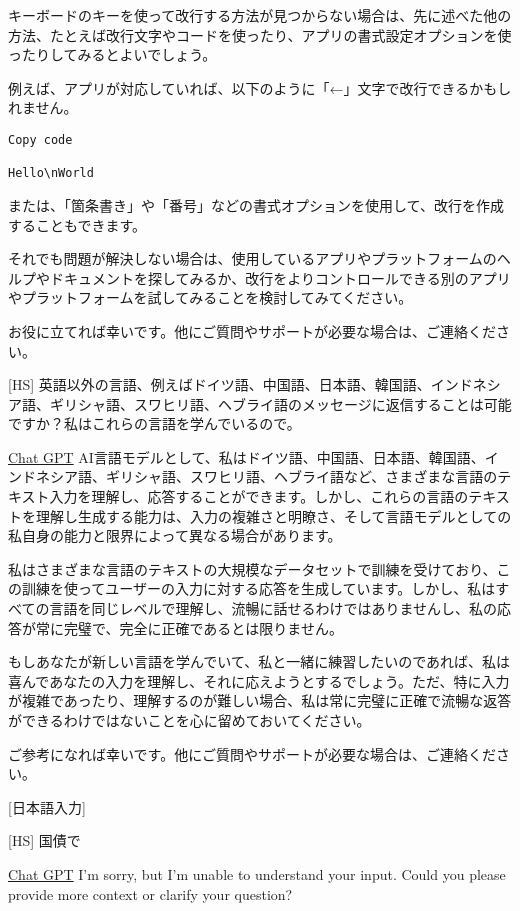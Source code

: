 \documentclass[
]{book}
\theoremstyle{definition}
\theoremstyle{definition}
\theoremstyle{definition}
\theoremstyle{definition}
\theoremstyle{remark}
\begin{document}
キーボードのキーを使って改行する方法が見つからない場合は、先に述べた他の方法、たとえば改行文字やコードを使ったり、アプリの書式設定オプションを使ったりしてみるとよいでしょう。

例えば、アプリが対応していれば、以下のように「←」文字で改行できるかもしれません。

\begin{verbatim}
Copy code

Hello\nWorld
\end{verbatim}

または、「箇条書き」や「番号」などの書式オプションを使用して、改行を作成することもできます。

それでも問題が解決しない場合は、使用しているアプリやプラットフォームのヘルプやドキュメントを探してみるか、改行をよりコントロールできる別のアプリやプラットフォームを試してみることを検討してみてください。

お役に立てれば幸いです。他にご質問やサポートが必要な場合は、ご連絡ください。

{[}HS{]} 英語以外の言語、例えばドイツ語、中国語、日本語、韓国語、インドネシア語、ギリシャ語、スワヒリ語、ヘブライ語のメッセージに返信することは可能ですか？私はこれらの言語を学んでいるので。

\protect\hyperlink{chatgpt}{Chat GPT} AI言語モデルとして、私はドイツ語、中国語、日本語、韓国語、インドネシア語、ギリシャ語、スワヒリ語、ヘブライ語など、さまざまな言語のテキスト入力を理解し、応答することができます。しかし、これらの言語のテキストを理解し生成する能力は、入力の複雑さと明瞭さ、そして言語モデルとしての私自身の能力と限界によって異なる場合があります。

私はさまざまな言語のテキストの大規模なデータセットで訓練を受けており、この訓練を使ってユーザーの入力に対する応答を生成しています。しかし、私はすべての言語を同じレベルで理解し、流暢に話せるわけではありませんし、私の応答が常に完璧で、完全に正確であるとは限りません。

もしあなたが新しい言語を学んでいて、私と一緒に練習したいのであれば、私は喜んであなたの入力を理解し、それに応えようとするでしょう。ただ、特に入力が複雑であったり、理解するのが難しい場合、私は常に完璧に正確で流暢な返答ができるわけではないことを心に留めておいてください。

ご参考になれば幸いです。他にご質問やサポートが必要な場合は、ご連絡ください。

{[}日本語入力{]}

{[}HS{]} 国債で

\protect\hyperlink{chatgpt}{Chat GPT} I'm sorry, but I'm unable to understand your input. Could you please provide more context or clarify your question?
\end{document}
